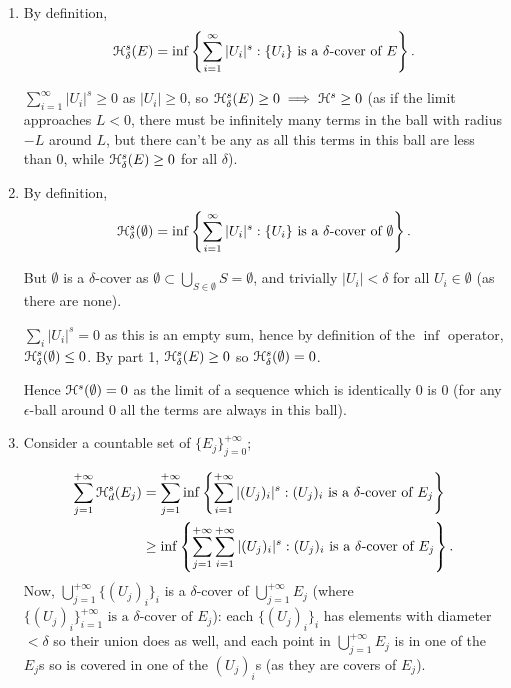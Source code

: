 
\begin{enumerate}
    \item By definition,
    \[\mathcal{H}^s_\delta(E) = \inf \left\{\sum_{i=1}^\infty |U_i|^s : \{U_i\}\text{ is a }\delta\text{-cover of }E\right\}.\]

    \(\sum_{i=1}^\infty |U_i|^s \geq 0\) as \(|U_i| \geq 0\), so \(\mathcal{H}^s_\delta(E) \geq 0 \implies \mathcal{H}^s \geq 0\) (as if the limit approaches \(L < 0\), there must be infinitely many terms in the ball with radius \(-L\) around \(L\), but there can't be any as all this terms in this ball are less than 0, while  \(\mathcal{H}_\delta^s(E) \geq 0\) for all \(\delta\)).

\item By definition,
    \[\mathcal{H}^s_\delta(\emptyset) = \inf \left\{ \sum_{i=1}^\infty |U_i|^s : \{U_i\} \text{ is a }\delta\text{-cover of }\emptyset\right\}.\]
    
    But \(\emptyset\) is a \(\delta\)-cover as \(\emptyset \subset \bigcup_{S \in \emptyset} S = \emptyset\), and trivially \(|U_i| < \delta\) for all \(U_i \in \emptyset\) (as there are none).

    \(\sum_i |U_i|^s = 0\) as this is an empty sum, hence by definition of the \(\inf\) operator, \(\mathcal{H}_\delta^s (\emptyset) \leq 0\). By part 1, \(\mathcal{H}^s_\delta(E) \geq 0\) so \(\mathcal{H}_\delta^s (\emptyset) = 0\).
    
    Hence \(\mathcal{H}^s (\emptyset) = 0\) as the limit of a sequence which is identically 0 is 0 (for any \(\epsilon\)-ball around \(0\) all the terms are always in this ball).

\item  Consider a countable set of $\{E_j\}_{j = 0}^{+\infty}$;

    \begin{align*}
    \sum_{j = 1}^{+\infty} \mathcal{H}_d^s(E_j) &= \sum_{j = 1}^{+\infty} \inf \left\{ \sum_{i = 1}^{+\infty} |(U_j)_i|^s : (U_j)_i \text{ is a }\delta\text{-cover of } E_j \right\} \\
    &\geq \inf \left\{ \sum_{j = 1}^{+\infty} \sum_{i = 1}^{+\infty} |(U_j)_i|^s : (U_j)_i \text{ is a }\delta\text{-cover of } E_j \right\}. 
    \end{align*}
    Now, \(\bigcup_{j = 1}^{+\infty} \{(U_j)_i\}_i\) is a \(\delta\)-cover of \(\bigcup_{j = 1}^{+\infty} E_j\) (where \(\{(U_j)_i\}_{i = 1}^{+\infty} \text{ is a }\delta\text{-cover of } E_j\)): each \(\{(U_j)_i\}_i\) has elements with diameter \(< \delta\) so their union does as well, and each point in \(\bigcup_{j = 1}^{+\infty} E_j\) is in one of the \(E_j\)s so is covered in one of the \((U_j)_i\)s (as they are covers of \(E_j\)). 
    

\end{enumerate}
